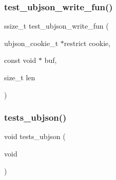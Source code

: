 \subsubsection{\texorpdfstring{test\+\_\+ubjson\+\_\+write\+\_\+fun()}{test\_ubjson\_write\_fun()}}
{\footnotesize\ttfamily ssize\+\_\+t test\+\_\+ubjson\+\_\+write\+\_\+fun (\begin{DoxyParamCaption}\item[{ubjson\+\_\+cookie\+\_\+t $\ast$restrict}]{cookie,  }\item[{const void $\ast$}]{buf,  }\item[{size\+\_\+t}]{len }\end{DoxyParamCaption})}

\mbox{\label{tests-ubjson_8c_a33c2a66c85c974b9b38c3edff503b11b}} 
\subsubsection{\texorpdfstring{tests\+\_\+ubjson()}{tests\_ubjson()}}
{\footnotesize\ttfamily void tests\+\_\+ubjson (\begin{DoxyParamCaption}\item[{void}]{ }\end{DoxyParamCaption})}


